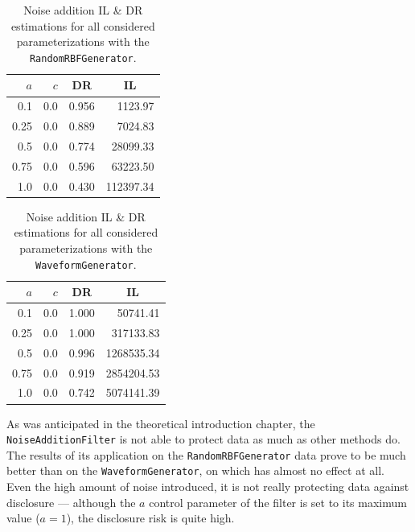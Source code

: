 \begin{minipage}[t]{0.5\textwidth}
	\begin{flushleft}
	\begin{table}[H]
		\centering
		\begin{tabular}{@{}rrrr@{}}
			\toprule
			$a$ & $c$ & \multicolumn{1}{c}{DR} & \multicolumn{1}{c}{IL} \\ \midrule
			0.1 & 0.0 & 0.956	& 1123.97 \\
			0.25 & 0.0 & 0.889 & 7024.83 \\
			0.5 & 0.0 & 0.774	& 28099.33 \\
			0.75 & 0.0 & 0.596 & 63223.50 \\
			1.0 & 0.0 & 0.430 & 112397.34 \\ \bottomrule
		\end{tabular}
		\caption[Noise addition DR \& IL estimations (\texttt{RandomRBFGenerator}).]{Noise addition IL \& DR estimations for all considered parameterizations with the \texttt{RandomRBFGenerator}.}
		\label{table:results-rbf-noise-addition}
	\end{table}
	\end{flushleft}
\end{minipage}
\begin{minipage}[t]{0.5\textwidth}
	\begin{flushright}
	\begin{table}[H]
		\centering
		\begin{tabular}{@{}rrrr@{}}
			\toprule
			$a$ & $c$ & \multicolumn{1}{c}{DR} & \multicolumn{1}{c}{IL} \\ \midrule
			0.1  & 0.0 & 1.000 & 50741.41   \\
			0.25 & 0.0 & 1.000 & 317133.83  \\
			0.5  & 0.0 & 0.996 & 1268535.34 \\
			0.75 & 0.0 & 0.919 & 2854204.53 \\
			1.0  & 0.0 & 0.742 & 5074141.39 \\ \bottomrule
		\end{tabular}
		\caption[Noise addition DR \& IL estimations (\texttt{WaveformGenerator}).]{Noise addition IL \& DR estimations for all considered parameterizations with the \texttt{WaveformGenerator}.}
		\label{table:results-wave-noise-addition}
	\end{table}
	\end{flushright}
\end{minipage}

As was anticipated in the theoretical introduction chapter, the \texttt{NoiseAdditionFilter} is not able to protect data as much as other methods do. The results of its application on the \texttt{RandomRBFGenerator} data prove to be much better than on the \texttt{WaveformGenerator}, on which has almost no effect at all. Even the high amount of noise introduced, it is not really protecting data against disclosure --- although the $a$ control parameter of the filter is set to its maximum value ($a = 1$), the disclosure risk is quite high.

